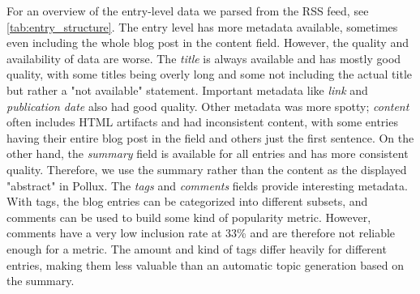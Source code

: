 \documentclass{article}
\begin{document}
For an overview of the entry-level data we parsed from the RSS feed, see \autoref{tab:entry_structure}. The entry level has more metadata available, sometimes even including the whole blog post in the content field. However, the quality and availability of data are worse. The \textit{title} is always available and has mostly good quality, with some titles being overly long and some not including the actual title but rather a "not available" statement. Important metadata like \textit{link} and \textit{publication date} also had good quality. Other metadata was more spotty; \textit{content} often includes HTML artifacts and had inconsistent content, with some entries having their entire blog post in the field and others just the first sentence. On the other hand, the \textit{summary} field is available for all entries and has more consistent quality. Therefore, we use the summary rather than the content as the displayed "abstract" in Pollux. The \textit{tags} and \textit{comments} fields provide interesting metadata. With tags, the blog entries can be categorized into different subsets, and comments can be used to build some kind of popularity metric. However, comments have a very low inclusion rate at 33\% and are therefore not reliable enough for a metric. The amount and kind of tags differ heavily for different entries, making them less valuable than an automatic topic generation based on the summary.
\end{document}
